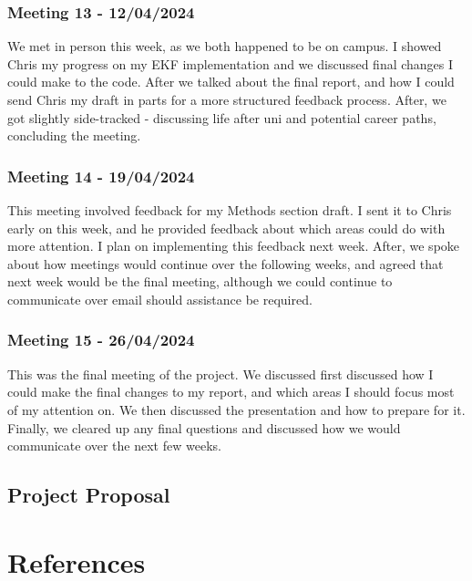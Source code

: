 \documentclass[12pt]{article}
\begin{document}
\subsubsection{Meeting 13 - 12/04/2024}
We met in person this week, as we both happened to be on campus. I showed Chris my progress on my EKF implementation and we discussed
final changes I could make to the code. After we talked about the final report, and how I could send Chris my draft in parts for a more
structured feedback process. After, we got slightly side-tracked - discussing life after uni and potential career paths, concluding
the meeting.\\
\subsubsection{Meeting 14 - 19/04/2024}
This meeting involved feedback for my Methods section draft. I sent it to Chris early on this week, and he provided feedback about which areas
could do with more attention. I plan on implementing this feedback next week. After, we spoke about how meetings would continue over the
following weeks, and agreed that next week would be the final meeting, although we could continue to communicate over email should assistance
be required.\\
\subsubsection{Meeting 15 - 26/04/2024}
This was the final meeting of the project. We discussed first discussed how I could make the final changes to my report, and which areas I should
focus most of my attention on. We then discussed the presentation and how to prepare for it. Finally, we cleared up any final questions and
discussed how we would communicate over the next few weeks.\\


\subsection{Project Proposal}



\section{References}
\end{document}
